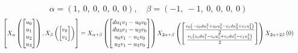 \documentclass[11pt]{article}
\theoremstyle{definition}
\begin{document}
\[
\alpha = \left( 1, \  0, \  0, \  0, \  0, \  0\right), \quad \beta = \left( -1, \  -1, \  0, \  0, \  0, \  0\right)
\]
\[
\scaletoalign{\textwidth}{\left[ X_{\alpha}\left(\left[\begin{matrix}u_{0}\\u_{1}\\u_{2}\\u_{3}\end{matrix}\right]\right), X_{\beta}\left(\left[\begin{matrix}v_{0}\\v_{1}\end{matrix}\right]\right) \right] = X_{\alpha + \beta}\left(\left[\begin{matrix}d u_{1} v_{1} - u_{0} v_{0}\\d u_{3} v_{1} - u_{2} v_{0}\\u_{0} v_{1} - u_{1} v_{0}\\u_{2} v_{1} - u_{3} v_{0}\end{matrix}\right]\right) X_{2\alpha + \beta}\left(\left[\begin{matrix}\frac{v_{0} \left(- c_{0} d u_{1}^{2} + c_{0} u_{0}^{2} - c_{1} d u_{3}^{2} + c_{1} u_{2}^{2}\right)}{2}\\\frac{v_{1} \left(c_{0} d u_{1}^{2} - c_{0} u_{0}^{2} + c_{1} d u_{3}^{2} - c_{1} u_{2}^{2}\right)}{2}\end{matrix}\right]\right) X_{2\alpha + 2\beta}\left(0\right)}
\]
\end{document}
